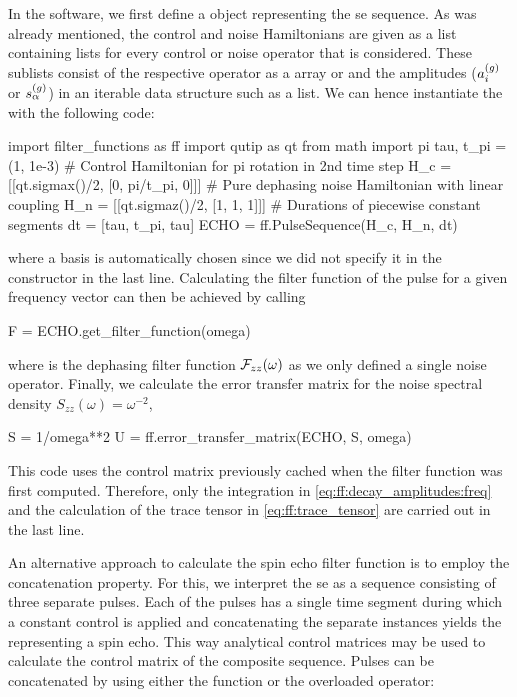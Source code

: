 In the software, we first define a \pulsesequence object representing the \gls{se} sequence.
As was already mentioned, the control and noise Hamiltonians are given as a list containing lists for every control or noise operator that is considered.
These sublists consist of the respective operator as a \numpy array or \qutip \qobj and the amplitudes ($a_i^{(g)}$ or $s_\alpha^{(g)}$) in an iterable data structure such as a list.
We can hence instantiate the \pulsesequence with the following code:

\begin{pycode}
    import filter_functions as ff
    import qutip as qt
    from math import pi
    tau, t_pi = (1, 1e-3)
    # Control Hamiltonian for pi rotation in 2nd time step
    H_c = [[qt.sigmax()/2, [0, pi/t_pi, 0]]]
    # Pure dephasing noise Hamiltonian with linear coupling
    H_n = [[qt.sigmaz()/2, [1, 1, 1]]]
    # Durations of piecewise constant segments
    dt = [tau, t_pi, tau]
    ECHO = ff.PulseSequence(H_c, H_n, dt)
\end{pycode}

where a basis is automatically chosen since we did not specify it in the constructor in the last line.
Calculating the filter function of the pulse for a given frequency vector  can then be achieved by calling

\begin{pycode}
    F = ECHO.get_filter_function(omega)
\end{pycode}

where  is the dephasing filter function $\mathcal{F}_{zz}(\omega)$ as we only defined a single noise operator.
Finally, we calculate the error transfer matrix \liouvUe for the noise spectral density $S_{zz}(\omega) = \omega^{-2}$,

\begin{pycode}
    S = 1/omega**2
    U = ff.error_transfer_matrix(ECHO, S, omega)
\end{pycode}

This code uses the control matrix previously cached when the filter function was first computed.
Therefore, only the integration in \cref{eq:ff:decay_amplitudes:freq} and the calculation of the trace tensor in \cref{eq:ff:trace_tensor} are carried out in the last line.

An alternative approach to calculate the spin echo filter function is to employ the concatenation property.
For this, we interpret the \gls{se} as a sequence consisting of three separate pulses.
Each of the pulses has a single time segment during which a constant control is applied and concatenating the separate \pulsesequence instances yields the \pulsesequence representing a spin echo.
This way analytical control matrices may be used to calculate the control matrix of the composite sequence.
Pulses can be concatenated by using either the  function or the overloaded  operator:

